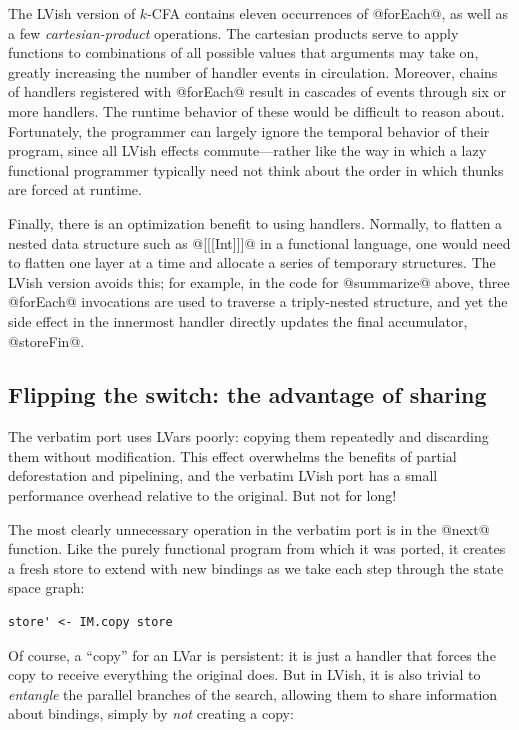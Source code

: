 The LVish version of $k$-CFA contains eleven occurrences of @forEach@,
as well as a few \emph{cartesian-product} operations.  The cartesian
products serve to apply functions to combinations of all possible
values that arguments may take on, greatly increasing the number of
handler events in circulation.  Moreover, chains of handlers
registered with @forEach@ result in cascades of events through six or
more handlers.  The runtime behavior of these would be difficult to
reason about.  Fortunately, the programmer can largely ignore the
temporal behavior of their program, since all LVish effects
commute---rather like the way in which a lazy functional programmer
typically need not think about the order in which thunks are forced at
runtime.

Finally, there is an optimization benefit to using handlers.
Normally, to flatten a nested data structure such as @[[[Int]]]@ in a
functional language, one would need to flatten one layer at a time and
allocate a series of temporary structures.  The LVish version avoids
this; for example, in the code for @summarize@ above, three @forEach@
invocations are used to traverse a triply-nested structure, and yet
the side effect in the innermost handler directly updates the final
accumulator, @storeFin@.

\subsection{Flipping the switch: the advantage of sharing}

The verbatim port uses LVars poorly: copying them repeatedly and
discarding them without modification.  This effect overwhelms the
benefits of partial deforestation and pipelining, and the verbatim
LVish port has a small performance overhead relative to the original.
But not for long!

The most clearly unnecessary operation in the verbatim port is in the
@next@ function.  Like the purely functional program from which it was
ported, it creates a fresh store to extend with new bindings as we
take each step through the state space graph:

\singlespacing
\begin{lstlisting}
store' <- IM.copy store 
\end{lstlisting}
\doublespacing

Of course, a ``copy'' for an LVar is persistent: it is just a handler
that forces the copy to receive everything the original does.  But in
LVish, it is also trivial to \emph{entangle} the parallel branches of
the search, allowing them to share information about bindings, simply
by \emph{not} creating a copy:

